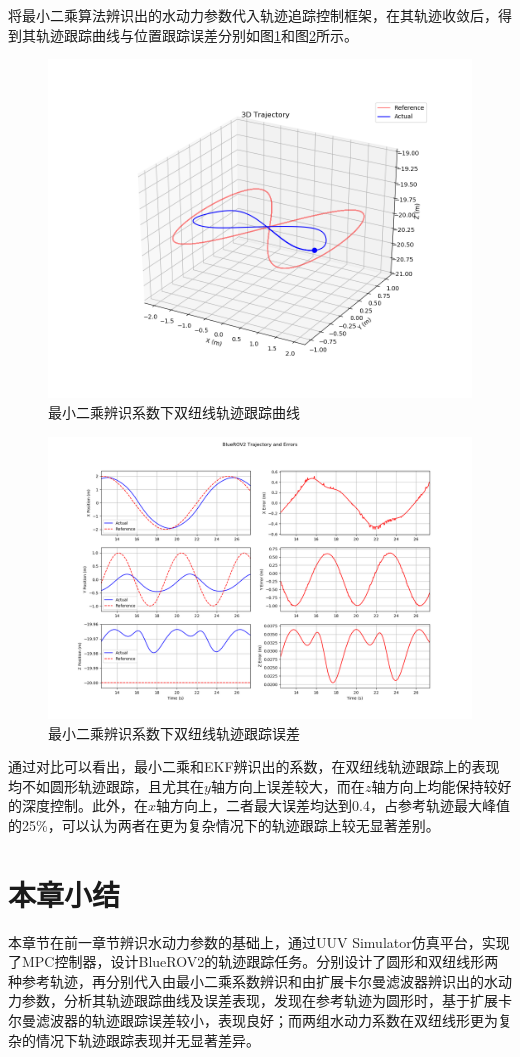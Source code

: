 将最小二乘算法辨识出的水动力参数代入轨迹追踪控制框架，在其轨迹收敛后，得到其轨迹跟踪曲线与位置跟踪误差分别如图\ref{f.lem_track_traj}和图\ref{f.lem_track_error}所示。

\begin{figure}[hbt]
    \centering
    \includegraphics[width=0.8\linewidth]{images/chapter4/ls_lem_traj.png}
    \caption{最小二乘辨识系数下双纽线轨迹跟踪曲线}
    \label{f.lem_track_traj}
\end{figure}
\begin{figure}[hbt]
    \centering
    \includegraphics[width=0.8\linewidth]{images/chapter4/ls_lem_error.png}
    \caption{最小二乘辨识系数下双纽线轨迹跟踪误差}
    \label{f.lem_track_error}
\end{figure}

通过对比可以看出，最小二乘和EKF辨识出的系数，在双纽线轨迹跟踪上的表现均不如圆形轨迹跟踪，且尤其在$y$轴方向上误差较大，而在$z$轴方向上均能保持较好的深度控制。此外，在$x$轴方向上，二者最大误差均达到0.4，占参考轨迹最大峰值的25\%，可以认为两者在更为复杂情况下的轨迹跟踪上较无显著差别。

\section{本章小结}

本章节在前一章节辨识水动力参数的基础上，通过UUV Simulator仿真平台，实现了MPC控制器，设计BlueROV2的轨迹跟踪任务。分别设计了圆形和双纽线形两种参考轨迹，再分别代入由最小二乘系数辨识和由扩展卡尔曼滤波器辨识出的水动力参数，分析其轨迹跟踪曲线及误差表现，发现在参考轨迹为圆形时，基于扩展卡尔曼滤波器的轨迹跟踪误差较小，表现良好；而两组水动力系数在双纽线形更为复杂的情况下轨迹跟踪表现并无显著差异。

\newpage



